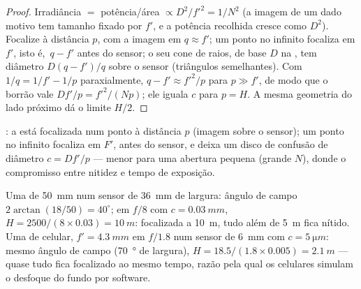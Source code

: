 \begin{proof}
Irradiância $=$ potência/área $\propto D^2/f'^2 = 1/N^2$ (a imagem de um
dado motivo tem tamanho fixado por $f'$, e a potência recolhida cresce
como $D^2$). Focalize à distância $p$, com a imagem em $q \approx f'$;
um ponto no infinito focaliza em $f'$, isto é,\ $q - f'$ antes do sensor;
o seu cone de raios, de base $D$ na , tem diâmetro $D(q - f')/q$
sobre o sensor (triângulos semelhantes). Com $1/q = 1/f' - 1/p$ paraxialmente,
$q - f' \approx f'^2/p$ para $p \gg f'$, de modo que o borrão vale
$Df'/p = f'^2/(Np)$; ele iguala $c$ para $p = H$. A mesma geometria do
lado próximo dá o limite $H/2$.
\end{proof}

\begin{omfigure}

{\small {}: a  está focalizada num ponto à distância $p$
(imagem sobre o sensor); um ponto no infinito focaliza em $F'$, antes do
sensor, e deixa um disco de confusão de diâmetro $c = Df'/p$ --- menor para uma
abertura pequena (grande $N$), donde o compromisso entre nitidez e
tempo de exposição.}
\end{omfigure}

\begin{example}\label{ex:b1:optical-instruments:cameras}
Uma  de \qty{50}{mm} num sensor de \qty{36}{mm} de largura: ângulo de campo
$2\arctan(18/50) = 40^\circ$; em $f/8$ com $c = \qty{0.03}{mm}$,
$H = 2500/(8 \times 0.03) = \qty{10}{m}$: focalizada a \qty{10}{m},
tudo além de \qty{5}{m} fica nítido. Uma  de celular, $f' = \qty{4.3}{mm}$
em $f/1.8$ num sensor de \qty{6}{mm} com $c = \qty{5}{\micro m}$: mesmo
ângulo de campo (\qty{70}{\degree} de largura), $H = 18.5/(1.8 \times 0.005) =
\qty{2.1}{m}$ --- quase tudo fica focalizado ao mesmo tempo, razão pela qual os
celulares simulam o desfoque do fundo por software.
\end{example}

